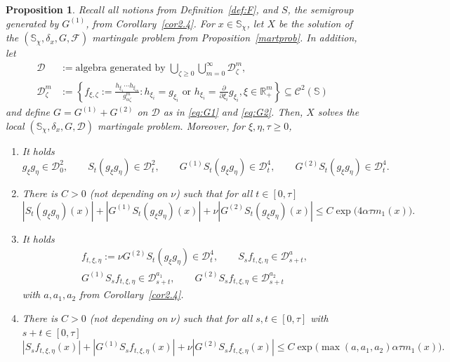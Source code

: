 \documentclass{imsart}
\theoremstyle{plain}
\newtheorem{proposition}[theorem]{Proposition}
\theoremstyle{definition}
\begin{document}
\begin{proposition}
    \label{P:locMartProb}
    Recall all notions from Definition~\ref{def:F}, and $S$, the semigroup generated by $G^{(1)}$, from Corollary~\ref{cor2.4}. For $x \in \mathbb S_{\chi}$, let $X$ be the solution of the $(\mathbb S_{\chi}, \delta_x, G, \mathcal F)$ martingale problem from Proposition~\ref{martprob}. In addition, let 
    \begin{align}\label{def:D}
    \mathcal D & := \text{algebra generated by } \bigcup_{{\zeta} \geq 0} \bigcup_{m=0}^\infty \mathcal D^m_{\zeta}, \\ 
    \mathcal D^m_{\zeta} & := \left\{ f_{\xi{, \zeta}} := \frac{h_{ \xi_1} \cdots h_{ \xi_m}}{g_{\alpha {\zeta}}^m}
    : h_{\xi_i} = g_{\xi_i} \text{ or }h_{\xi_i} = \frac{\partial}{\partial \xi_i} g_{\xi_i},  
    \xi \in \mathbb R_+^m
    \right\} \subseteq \mathcal C^2(\mathbb S)
    \end{align}
    and define $G = G^{(1)} + G^{(2)}$ on $\mathcal D$ as in \eqref{eq:G1} and \eqref{eq:G2}. Then, $X$ solves the local $(\mathbb S_{\chi}, \delta_x, G, \mathcal D)$ martingale problem. Moreover, for $\xi, \eta, \tau \geq 0$, 
    \begin{enumerate}
        \item It holds
        $$ g_{ \xi} g_{ \eta} \in \mathcal D_0^2, \qquad S_t (g_{ \xi} g_{ \eta}) \in \mathcal D_t^2, \qquad G^{(1)}S_t(g_{ \xi} g_{ \eta})\in\mathcal D_t^4, \qquad G^{(2)}S_t(g_{ \xi} g_{ \eta})\in\mathcal D_t^4.$$
    \item There is $C>0$ (not depending on $\nu$) such that for all $t \in [0,\tau]$
    $$ |S_t (g_{ \xi} g_{ \eta})(x)| + |G^{(1)} S_t (g_{ \xi} g_{ \eta})(x)| + \nu |G^{(2)} S_t (g_{ \xi} g_{ \eta})(x)| \leq C \exp\Big( 4 \alpha \tau m_1(x)\Big). $$
    \item It holds
    \begin{align*}
    & f_{t, \xi, \eta} := \nu G^{(2)}S_t (g_{ \xi} g_{ \eta}) \in \mathcal D_t^4, \qquad S_s f_{t, \xi, \eta} \in \mathcal D_{s+t}^a, \\ & G^{(1)} S_s f_{t, \xi, \eta} \in \mathcal D_{s+t}^{a_1}, \qquad G^{(2)} S_s f_{t, \xi, \eta} \in \mathcal D_{s+t}^{a_2}   
    \end{align*}
    with $a, a_1, a_2$ from Corollary~\ref{cor2.4}.
    \item There is $C>0$ (not depending on $\nu$) such that for all $s, t \in [0,\tau]$ with $s+t \in [0, \tau]$
    $$ |S_s f_{t, \xi, \eta}(x)| + |G^{(1)} S_s f_{t, \xi, \eta}(x)| + \nu |G^{(2)} S_s f_{t, \xi, \eta}(x)| \!\leq\! C \exp\Big( \max(a, a_1, a_2) \alpha \tau m_1(x)\Big). $$
\end{enumerate}
\end{proposition}
\end{document}
